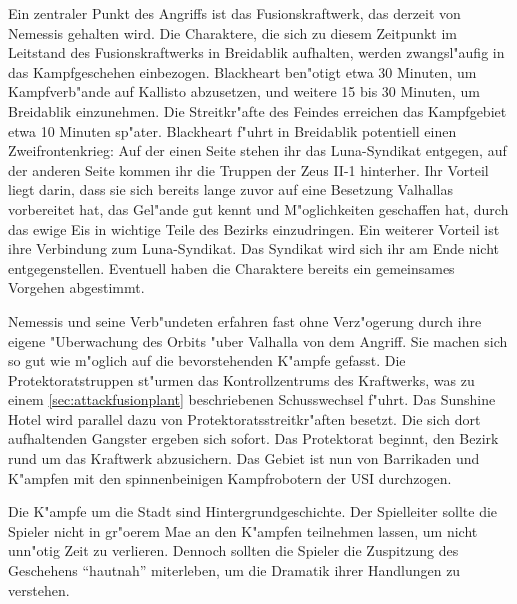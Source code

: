 Ein zentraler Punkt des Angriffs ist das Fusionskraftwerk, das derzeit von Nemessis gehalten wird. Die Charaktere, die sich zu diesem Zeitpunkt im Leitstand des Fusionskraftwerks in Breidablik aufhalten, werden zwangsl"aufig in das Kampfgeschehen einbezogen. Blackheart ben"otigt etwa 30 Minuten, um Kampfverb"ande auf Kallisto abzusetzen, und weitere 15 bis 30 Minuten, um Breidablik einzunehmen. Die Streitkr"afte des Feindes erreichen das Kampfgebiet etwa 10 Minuten sp"ater. Blackheart f"uhrt in Breidablik potentiell einen Zweifrontenkrieg: Auf der einen Seite stehen ihr das Luna-Syndikat entgegen, auf der anderen Seite kommen ihr die Truppen der Zeus II-1 hinterher. Ihr Vorteil liegt darin, dass sie sich bereits lange zuvor auf eine Besetzung Valhallas vorbereitet hat, das Gel"ande gut kennt und M"oglichkeiten geschaffen hat, durch das ewige Eis in wichtige Teile des Bezirks einzudringen. Ein weiterer Vorteil ist ihre Verbindung zum Luna-Syndikat. Das Syndikat wird sich ihr am Ende nicht entgegenstellen. Eventuell haben die Charaktere bereits ein gemeinsames Vorgehen abgestimmt.

Nemessis und seine Verb"undeten erfahren fast ohne Verz"ogerung durch ihre eigene "Uberwachung des Orbits "uber Valhalla von dem Angriff. Sie machen sich so gut wie m"oglich auf die bevorstehenden K"ampfe gefasst. Die Protektoratstruppen st"urmen das Kontrollzentrums des Kraftwerks, was zu einem \cref{sec:attackfusionplant} beschriebenen Schusswechsel f"uhrt. Das Sunshine Hotel wird parallel dazu von Protektoratsstreitkr"aften besetzt. Die sich dort aufhaltenden Gangster ergeben sich sofort. Das Protektorat beginnt, den Bezirk rund um das Kraftwerk abzusichern. Das Gebiet ist nun von Barrikaden und K"ampfen mit den spinnenbeinigen Kampfrobotern der USI durchzogen.

\begin{remarks}
	Die K"ampfe um die Stadt sind Hintergrundgeschichte. Der Spielleiter sollte die Spieler nicht in gr"o\3erem Ma\3e an den K"ampfen teilnehmen lassen, um nicht unn"otig Zeit zu verlieren. Dennoch sollten die Spieler die Zuspitzung des Geschehens "`hautnah"' miterleben, um die Dramatik ihrer Handlungen zu verstehen.
 \end{remarks}
